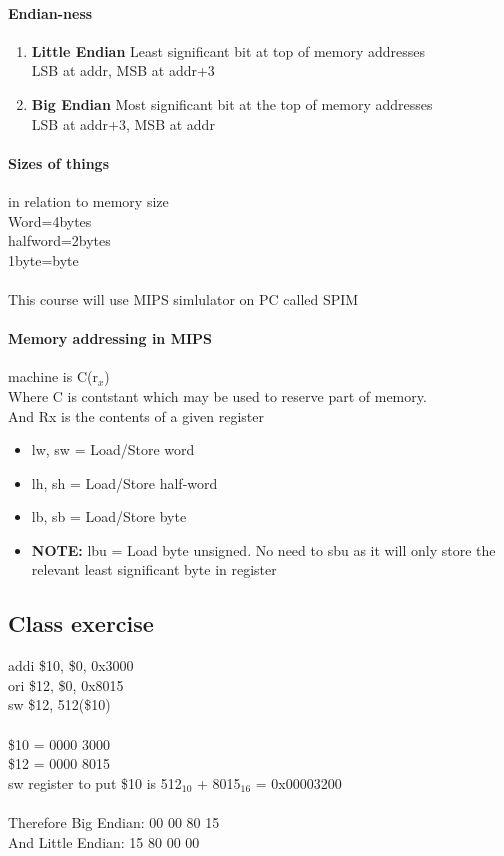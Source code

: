 \documentclass{article}
\newcommand\tab[1][0.5cm]{\hspace*{#1}}
\begin{document}
		\paragraph{Endian-ness}
		\begin{enumerate}
			\item \textbf{Little Endian} Least significant bit at top of memory addresses \\
			LSB at addr, MSB at addr+3
			\item \textbf{Big Endian} Most significant bit at the top of memory addresses \\
			LSB at addr+3, MSB at addr
		\end{enumerate}

		\paragraph{Sizes of things} in relation to memory size \\ \tab Word=4bytes \\ 
		\tab halfword=2bytes \\ 
		\tab 1byte=byte\\ \\
		This course will use MIPS simlulator on PC called SPIM

		\paragraph{Memory addressing in MIPS} machine is C(r$_x$)
			\\ \tab Where C is contstant which may be used to reserve part of memory. 
			\\ \tab And Rx is the contents of a given register

		\begin{itemize}
			\item lw, sw = Load/Store word
			\item lh, sh = Load/Store half-word
			\item lb, sb = Load/Store byte
			\item \textbf{NOTE: } 	lbu = Load byte unsigned. No need to sbu as it will only store the relevant least significant byte in register
		\end{itemize}


	\subsection{Class exercise}
		addi \$10, \$0, 0x3000 \\
		ori \$12, \$0, 0x8015 \\
		sw \$12, 512(\$10) \\ \\
		\$10 = 0000 3000 \\
		\$12 = 0000 8015 \\
		sw register to put \$10 is 512$_{10}$ + 8015$_{16}$ = 0x00003200 \\\\
		Therefore Big Endian: \tab 00 00 80 15 \\
		And Little Endian: \tab \tab 15 80 00 00
\end{document}

